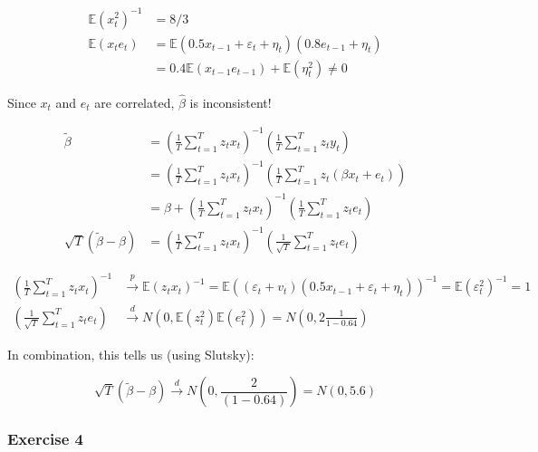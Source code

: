 {{\begin{enumerate}[label=(\alph*)]
{$$
\begin{aligned}
\mathbb{E}\left(x_{t}^{2}\right)^{-1} & =8 / 3 \\
\mathbb{E}\left(x_{t} e_{t}\right) & =\mathbb{E}\left(0.5 x_{t-1}+\varepsilon_{t}+\eta_{t}\right)\left(0.8 e_{t-1}+\eta_{t}\right) \\
& =0.4 \mathbb{E}\left(x_{t-1} e_{t-1}\right)+\mathbb{E}\left(\eta_{t}^{2}\right) \neq 0
\end{aligned}
$$

Since $x_{t}$ and $e_t$ are correlated, $\hat{\beta}$ is inconsistent!
}
{\item 
$$
\begin{aligned}
\tilde{\beta} & =\left(\frac{1}{T} \sum_{t=1}^{T} z_{t} x_{t}\right)^{-1}\left(\frac{1}{T} \sum_{t=1}^{T} z_{t} y_{t}\right) \\
&=\left(\frac{1}{T} \sum_{t=1}^{T} z_{t} x_{t}\right)^{-1}\left(\frac{1}{T} \sum_{t=1}^{T} z_{t}\left(\beta x_{t}+e_{t}\right)\right) \\
&=\beta+\left(\frac{1}{T} \sum_{t=1}^{T} z_{t} x_{t}\right)^{-1}\left(\frac{1}{T} \sum_{t=1}^{T} z_{t} e_{t}\right) \\
\sqrt{T}(\tilde{\beta}-\beta) &= \left(\frac{1}{T} \sum_{t=1}^{T} z_{t} x_{t}\right)^{-1}\left(\frac{1}{\sqrt{T}} \sum_{t=1}^{T} z_{t} e_{t}\right)
\end{aligned}
$$

$$
\begin{aligned}
\left(\frac{1}{T} \sum_{t=1}^{T} z_{t} x_{t}\right)^{-1} &\xrightarrow{p} \mathbb{E}\left(z_{t} x_{t}\right)^{-1} =\mathbb{E}\left(\left(\varepsilon_{t}+v_{t}\right)\left(0.5 x_{t-1}+\varepsilon_{t}+\eta_{t}\right)\right)^{-1} =\mathbb{E}\left(\varepsilon_{t}^{2}\right)^{-1}=1 \\
\left(\frac{1}{\sqrt{T}} \sum_{t=1}^{T} z_{t} e_{t}\right) &\xrightarrow{d} N\left(0, \mathbb{E}\left(z_{t}^{2}\right) \mathbb{E}\left(e_{t}^{2}\right)\right) =N\left(0,2 \frac{1}{1-0.64}\right)
\end{aligned}
$$

In combination, this tells us (using Slutsky):

$$
\sqrt{T}(\tilde{\beta}-\beta) \xrightarrow{d} N\left(0, \frac{2}{(1-0.64)}\right)=N(0,5.6)
$$
}
\end{enumerate}
}
{
\subsubsection*{Exercise 4}

}}
